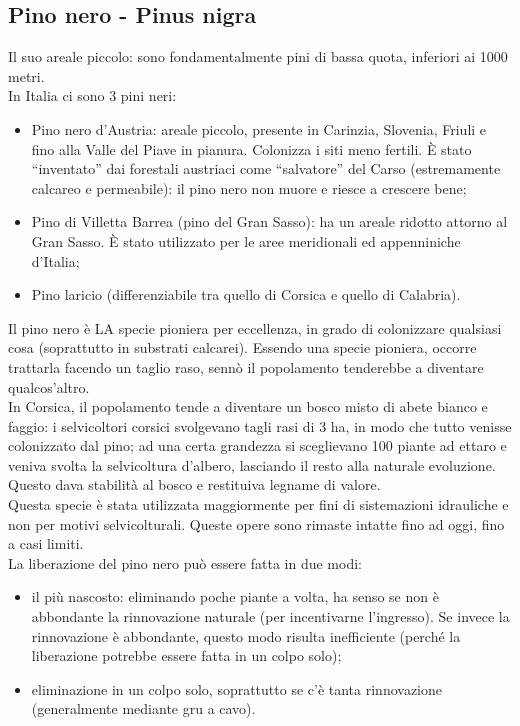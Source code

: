 \subsection{Pino nero - Pinus nigra}
Il suo areale piccolo: sono fondamentalmente pini di bassa quota, inferiori ai 1000 metri.\\
In Italia ci sono 3 pini neri: 
\begin{itemize}[nosep]
    \item Pino nero d'Austria: areale piccolo, presente in Carinzia, Slovenia, Friuli e fino alla Valle del Piave in pianura. Colonizza i siti meno fertili. È stato ``inventato'' dai forestali austriaci come ``salvatore'' del Carso (estremamente calcareo e permeabile): il pino nero non muore e riesce a crescere bene;
    \item Pino di Villetta Barrea (pino del Gran Sasso): ha un areale ridotto attorno al Gran Sasso. È stato utilizzato per le aree meridionali ed appenniniche d'Italia;
    \item Pino laricio (differenziabile tra quello di Corsica e quello di Calabria).
\end{itemize}
Il pino nero è LA specie pioniera per eccellenza, in grado di colonizzare qualsiasi cosa (soprattutto in substrati calcarei). Essendo una specie pioniera, occorre trattarla facendo un taglio raso, sennò il popolamento tenderebbe a diventare qualcos'altro.\\
In Corsica, il popolamento tende a diventare un bosco misto di abete bianco e faggio: i selvicoltori corsici svolgevano tagli rasi di 3 ha, in modo che tutto venisse colonizzato dal pino; ad una certa grandezza si sceglievano 100 piante ad ettaro e veniva svolta la selvicoltura d'albero, lasciando il resto alla naturale evoluzione. Questo dava stabilità al bosco e restituiva legname di valore.\\
Questa specie è stata utilizzata maggiormente per fini di sistemazioni idrauliche e non per motivi selvicolturali. Queste opere sono rimaste intatte fino ad oggi, fino a casi limiti.\\
La liberazione del pino nero può essere fatta in due modi:
\begin{itemize}[nosep]
    \item il più nascosto: eliminando poche piante a volta, ha senso se non è abbondante la rinnovazione naturale (per incentivarne l'ingresso). Se invece la rinnovazione è abbondante, questo modo risulta inefficiente (perché la liberazione potrebbe essere fatta in un colpo solo); 
    \item eliminazione in un colpo solo, soprattutto se c'è tanta rinnovazione (generalmente mediante gru a cavo).
\end{itemize}
